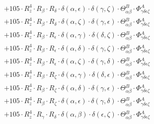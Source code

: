 \documentclass{article}
\begin{document}
\begin{equation}
\begin{array}{c}
 \\[0.2em] 		 + 105 \cdot R_{z}^{4} \cdot R_{\beta{}} \cdot R_{\delta{}} \cdot \delta{}\left(\alpha{}, \epsilon{}\right) \cdot \delta{}\left(\gamma{}, \zeta{}\right) \cdot \Theta{}^{B}_{\alpha{}\beta{}} \cdot \Phi{}^{A}_{\gamma{}\delta{}\epsilon{}\zeta{}} 
 \\[0.2em] 		 + 105 \cdot R_{z}^{4} \cdot R_{\beta{}} \cdot R_{\delta{}} \cdot \delta{}\left(\alpha{}, \zeta{}\right) \cdot \delta{}\left(\gamma{}, \epsilon{}\right) \cdot \Theta{}^{B}_{\alpha{}\beta{}} \cdot \Phi{}^{A}_{\gamma{}\delta{}\epsilon{}\zeta{}} 
 \\[0.2em] 		 + 105 \cdot R_{z}^{4} \cdot R_{\beta{}} \cdot R_{\epsilon{}} \cdot \delta{}\left(\alpha{}, \gamma{}\right) \cdot \delta{}\left(\delta{}, \zeta{}\right) \cdot \Theta{}^{B}_{\alpha{}\beta{}} \cdot \Phi{}^{A}_{\gamma{}\delta{}\epsilon{}\zeta{}} 
 \\[0.2em] 		 + 105 \cdot R_{z}^{4} \cdot R_{\beta{}} \cdot R_{\epsilon{}} \cdot \delta{}\left(\alpha{}, \delta{}\right) \cdot \delta{}\left(\gamma{}, \zeta{}\right) \cdot \Theta{}^{B}_{\alpha{}\beta{}} \cdot \Phi{}^{A}_{\gamma{}\delta{}\epsilon{}\zeta{}} 
 \\[0.2em] 		 + 105 \cdot R_{z}^{4} \cdot R_{\beta{}} \cdot R_{\epsilon{}} \cdot \delta{}\left(\alpha{}, \zeta{}\right) \cdot \delta{}\left(\gamma{}, \delta{}\right) \cdot \Theta{}^{B}_{\alpha{}\beta{}} \cdot \Phi{}^{A}_{\gamma{}\delta{}\epsilon{}\zeta{}} 
 \\[0.2em] 		 + 105 \cdot R_{z}^{4} \cdot R_{\beta{}} \cdot R_{\zeta{}} \cdot \delta{}\left(\alpha{}, \gamma{}\right) \cdot \delta{}\left(\delta{}, \epsilon{}\right) \cdot \Theta{}^{B}_{\alpha{}\beta{}} \cdot \Phi{}^{A}_{\gamma{}\delta{}\epsilon{}\zeta{}} 
 \\[0.2em] 		 + 105 \cdot R_{z}^{4} \cdot R_{\beta{}} \cdot R_{\zeta{}} \cdot \delta{}\left(\alpha{}, \delta{}\right) \cdot \delta{}\left(\gamma{}, \epsilon{}\right) \cdot \Theta{}^{B}_{\alpha{}\beta{}} \cdot \Phi{}^{A}_{\gamma{}\delta{}\epsilon{}\zeta{}} 
 \\[0.2em] 		 + 105 \cdot R_{z}^{4} \cdot R_{\beta{}} \cdot R_{\zeta{}} \cdot \delta{}\left(\alpha{}, \epsilon{}\right) \cdot \delta{}\left(\gamma{}, \delta{}\right) \cdot \Theta{}^{B}_{\alpha{}\beta{}} \cdot \Phi{}^{A}_{\gamma{}\delta{}\epsilon{}\zeta{}} 
 \\[0.2em] 		 + 105 \cdot R_{z}^{4} \cdot R_{\gamma{}} \cdot R_{\delta{}} \cdot \delta{}\left(\alpha{}, \beta{}\right) \cdot \delta{}\left(\epsilon{}, \zeta{}\right) \cdot \Theta{}^{B}_{\alpha{}\beta{}} \cdot \Phi{}^{A}_{\gamma{}\delta{}\epsilon{}\zeta{}} 

\end{array}
\end{equation}
\end{document}
